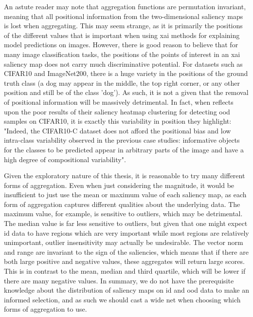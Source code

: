 \documentclass[UKenglish]{uiomasterthesis} %
\theoremstyle{definition}
\begin{document}
An astute reader may note that aggregation functions are permutation invariant, meaning that all positional information from the two-dimensional saliency maps is lost when aggregating. This may seem strange, as it is primarily the positions of the different values that is important when using \ac{xai} methods for explaining model predictions on images. However, there is good reason to believe that for many image classification tasks, the positions of the points of interest in an \ac{xai} saliency map does not carry much discriminative potential. For datasets such as CIFAR10 and ImageNet200, there is a huge variety in the positions of the ground truth class (a dog may appear in the middle, the top right corner, or any other position and still be of the class 'dog'). As such, it is not a given that the removal of positional information will be massively detrimental. In fact, when \cite{martinez} reflects upon the poor results of their saliency heatmap clustering for detecting \ac{ood} samples on CIFAR10, it is exactly this variability in position they highlight: "Indeed, the CIFAR10-C dataset does not afford the positional bias and low intra-class variability observed in the previous case studies: informative objects for the classes to be predicted appear in arbitrary parts of the image and have a high degree of compositional variability".

Given the exploratory nature of this thesis, it is reasonable to try many different forms of aggregation. Even when just considering the magnitude, it would be insufficient to just use the mean or maximum value of each saliency map, as each form of aggregation captures different qualities about the underlying data. The maximum value, for example, is sensitive to outliers, which may be detrimental. The median value is far less sensitive to outliers, but given that one might expect \ac{id} data to have regions which are very important while most regions are relatively unimportant, outlier insensitivity may actually be undesirable. The vector norm and range are invariant to the sign of the saliencies, which means that if there are both large positive and negative values, these aggregates will return large scores. This is in contrast to the mean, median and third quartile, which will be lower if there are many negative values. In summary, we do not have the prerequisite knowledge about the distribution of saliency maps on \ac{id} and \ac{ood} data to make an informed selection, and as such we should cast a wide net when choosing which forms of aggregation to use.
\end{document}
